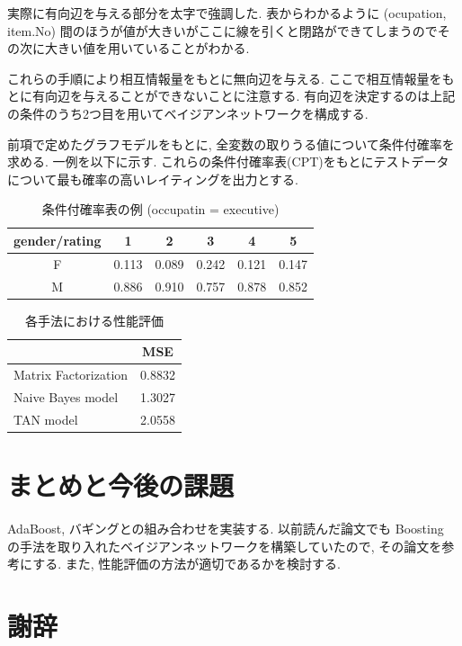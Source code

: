 \documentclass[a4j,12pt]{jarticle}
\begin{document}
実際に有向辺を与える部分を太字で強調した. 表からわかるように (ocupation, item.No) 間のほうが値が大きいがここに線を引くと閉路ができてしまうのでその次に大きい値を用いていることがわかる.

これらの手順により相互情報量をもとに無向辺を与える. ここで相互情報量をもとに有向辺を与えることができないことに注意する. 有向辺を決定するのは上記の条件のうち2つ目を用いてベイジアンネットワークを構成する.

前項で定めたグラフモデルをもとに, 全変数の取りうる値について条件付確率を求める. 一例を以下に示す. これらの条件付確率表(CPT)をもとにテストデータについて最も確率の高いレイティングを出力とする.

\begin{table}[H]
\begin{center}
\caption{条件付確率表の例 (occupatin = executive)}
\begin{tabular}{|c||c|c|c|c|c|} \hline  
gender/rating & 1 & 2 & 3 & 4 & 5 \\ \hline \hline
F & 0.113 & 0.089 & 0.242 & 0.121 & 0.147 \\
M & 0.886 & 0.910 & 0.757 & 0.878 & 0.852 \\ \hline
\end{tabular}
\end{center}
\end{table}

\begin{table}[H]
\begin{center}
\caption{各手法における性能評価}   %
\label{modelmse}   %
\begin{tabular}{l c}
\hline
                            & MSE \\ \hline
Matrix Factorization &  0.8832 \\ \hline
Naive Bayes model  & 1.3027 \\ \hline
TAN model             & 2.0558 \\ \hline
\end{tabular}
\end{center}
\end{table}

\section{まとめと今後の課題}

AdaBoost, バギングとの組み合わせを実装する. 以前読んだ論文でも Boosting の手法を取り入れたベイジアンネットワークを構築していたので, その論文を参考にする. また, 性能評価の方法が適切であるかを検討する. 

\section{謝辞}

\newpage
{} %




\end{document}
